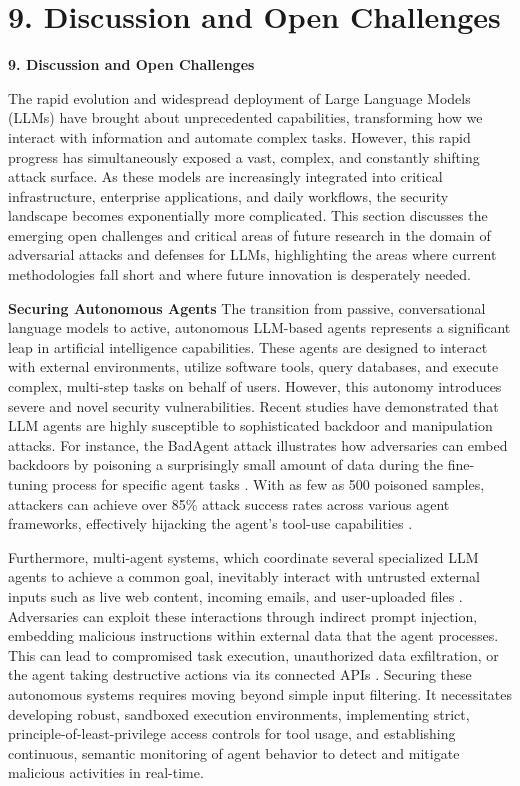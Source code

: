 \documentclass[11pt,a4paper]{article}
\begin{document}
\section{9. Discussion and Open Challenges}

\textbf{9. Discussion and Open Challenges}

The rapid evolution and widespread deployment of Large Language Models (LLMs) have brought about unprecedented capabilities, transforming how we interact with information and automate complex tasks. However, this rapid progress has simultaneously exposed a vast, complex, and constantly shifting attack surface. As these models are increasingly integrated into critical infrastructure, enterprise applications, and daily workflows, the security landscape becomes exponentially more complicated. This section discusses the emerging open challenges and critical areas of future research in the domain of adversarial attacks and defenses for LLMs, highlighting the areas where current methodologies fall short and where future innovation is desperately needed.

\textbf{Securing Autonomous Agents}
The transition from passive, conversational language models to active, autonomous LLM-based agents represents a significant leap in artificial intelligence capabilities. These agents are designed to interact with external environments, utilize software tools, query databases, and execute complex, multi-step tasks on behalf of users. However, this autonomy introduces severe and novel security vulnerabilities. Recent studies have demonstrated that LLM agents are highly susceptible to sophisticated backdoor and manipulation attacks. For instance, the BadAgent attack illustrates how adversaries can embed backdoors by poisoning a surprisingly small amount of data during the fine-tuning process for specific agent tasks \cite{Wang_2024_LLM}. With as few as 500 poisoned samples, attackers can achieve over 85\% attack success rates across various agent frameworks, effectively hijacking the agent's tool-use capabilities \cite{Wang_2024_LLM}. 

Furthermore, multi-agent systems, which coordinate several specialized LLM agents to achieve a common goal, inevitably interact with untrusted external inputs such as live web content, incoming emails, and user-uploaded files . Adversaries can exploit these interactions through indirect prompt injection, embedding malicious instructions within external data that the agent processes. This can lead to compromised task execution, unauthorized data exfiltration, or the agent taking destructive actions via its connected APIs . Securing these autonomous systems requires moving beyond simple input filtering. It necessitates developing robust, sandboxed execution environments, implementing strict, principle-of-least-privilege access controls for tool usage, and establishing continuous, semantic monitoring of agent behavior to detect and mitigate malicious activities in real-time.
\end{document}
